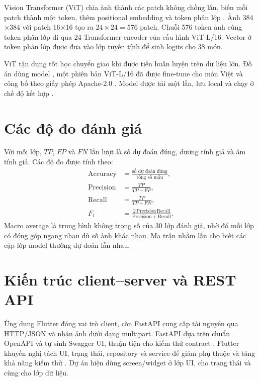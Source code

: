 Vision Transformer (ViT) chia ảnh thành các patch không chồng lấn, biến mỗi
patch thành một token, thêm positional embedding và token phân lớp
\cite{dosovitskiy2021vit}. Ảnh 384$\times$384 với patch 16$\times$16 tạo
ra $24\times24=576$ patch. Chuỗi 576 token ảnh cùng token phân lớp đi qua 24
Transformer encoder của cấu hình ViT-L/16. Vector ở token phân lớp được đưa
vào lớp tuyến tính để sinh logits cho 38 món.

ViT tận dụng tốt học chuyển giao khi được tiền huấn luyện trên dữ liệu lớn.
Đồ án dùng model , một phiên bản
ViT-L/16 đã được fine-tune cho món Việt và công bố theo giấy phép Apache-2.0
\cite{vietTungModel}. Model được tải một lần, lưu local và chạy ở chế độ
 kết hợp .

\section{Các độ đo đánh giá}

Với mỗi lớp, $TP$, $FP$ và $FN$ lần lượt là số dự đoán đúng, dương tính giả
và âm tính giả. Các độ đo được tính theo:
\begin{align}
\mathrm{Accuracy} &= \frac{\text{số dự đoán đúng}}{\text{tổng số mẫu}},\\
\mathrm{Precision} &= \frac{TP}{TP+FP},\\
\mathrm{Recall} &= \frac{TP}{TP+FN},\\
F_1 &= \frac{2\,\mathrm{Precision}\,\mathrm{Recall}}
{\mathrm{Precision}+\mathrm{Recall}}.
\end{align}
Macro average là trung bình không trọng số của 30 lớp đánh giá, nhờ đó mỗi
lớp có đóng góp ngang nhau dù số ảnh khác nhau. Ma trận nhầm lẫn cho biết các
cặp lớp model thường dự đoán lẫn nhau.

\section{Kiến trúc client--server và REST API}

Ứng dụng Flutter đóng vai trò client, còn FastAPI cung cấp tài nguyên qua
HTTP/JSON và nhận ảnh dưới dạng multipart. FastAPI dựa trên chuẩn OpenAPI và
tự sinh Swagger UI, thuận tiện cho kiểm thử contract \cite{fastapiDocs}.
Flutter khuyến nghị tách UI, trạng thái, repository và service để giảm phụ
thuộc và tăng khả năng kiểm thử \cite{flutterArchitecture}. Dự án hiện dùng
screen/widget ở lớp UI,  cho trạng thái và 
cùng  cho lớp dữ liệu.

